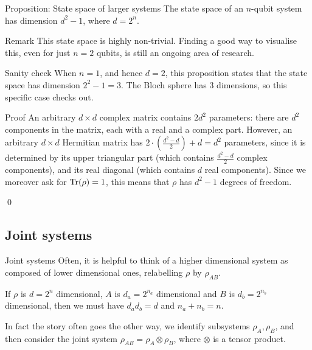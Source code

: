 \documentclass[a4paper]{article}
\begin{document}
\begin{parag}{Proposition: State space of larger systems}
    The state space of an $n$-qubit system has dimension $d^2 - 1$, where $d = 2^n$.

    \begin{subparag}{Remark}
        This state space is highly non-trivial. Finding a good way to visualise this, even for just $n = 2$ qubits, is still an ongoing area of research.
    \end{subparag}

    \begin{subparag}{Sanity check}
        When $n = 1$, and hence $d = 2$, this proposition states that the state space has dimension $2^2 - 1 = 3$. The Bloch sphere has 3 dimensions, so this specific case checks out.
    \end{subparag}

    \begin{subparag}{Proof}
        An arbitrary $d \times d$ complex matrix contains $2 d^2$ parameters: there are $d^2$ components in the matrix, each with a real and a complex part. However, an arbitrary $d \times d$ Hermitian matrix has $2\cdot \left(\frac{d^2 - d}{2}\right) + d = d^2$ parameters, since it is determined by its upper triangular part (which contains $\frac{d^2 - d}{2}$ complex components), and its real diagonal (which contains $d$ real components). Since we moreover ask for $\Tr\left(\rho\right) = 1$, this means that $\rho$ has $d^2 - 1$ degrees of freedom. 

        \qed
    \end{subparag}
\end{parag}

\subsection{Joint systems}

\begin{parag}{Joint systems}
    Often, it is helpful to think of a higher dimensional system as composed of lower dimensional ones, relabelling $\rho$ by $\rho_{AB}$.

    If $\rho$ is $d = 2^n$ dimensional, $A$ is $d_a = 2^{n_a}$ dimensional and $B$ is $d_b = 2^{n_b}$ dimensional, then we must have $d_a d_b = d$ and $n_a + n_b = n$.

    In fact the story often goes the other way, we identify subsystems $\rho_A, \rho_B$, and then consider the joint system $\rho_{AB} = \rho_A \otimes \rho_B$, where $\otimes$ is a tensor product.
\end{parag}
\end{document}
